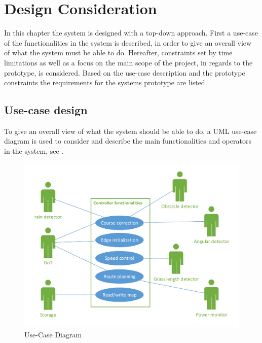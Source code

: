 \chapter{Design Consideration}
\vspace{-5 mm}
In this chapter the system is designed with a top-down approach. First a use-case of the functionalities in the system is described, in order to give an overall view of what the system must be able to do. Hereafter, constraints set by time limitations as well as a focus on the main scope of the project, in regards to the prototype, is considered. Based on the use-case description and the prototype constraints the requirements for the systems prototype are listed.
\vspace{-4 mm}
\section{Use-case design}
To give an overall view of what the system should be able to do, a UML use-case diagram is used to consider and describe the main functionalities and operators in the system, see .
\vspace{-3 mm}
 \begin{figure}[H]
	\centering
	\includegraphics[scale=0.8]{figures/P5UseCase.pdf}
	\caption{Use-Case Diagram}
	\label{fig:usecase}
	\flushleft
\end{figure}

